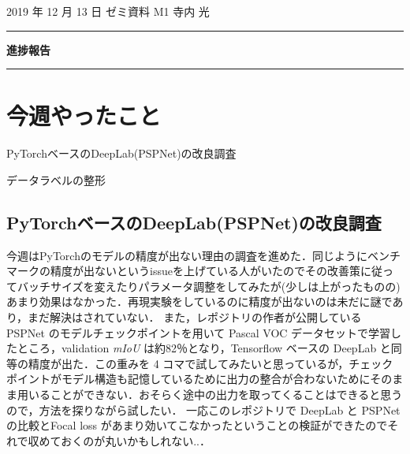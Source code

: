 \documentclass[onecolumn]{ujarticle}   %
\begin{document}
	\noindent

	\hspace{1em}
	2019 年 12 月 13 日
	ゼミ資料
	\hfill
	M1 寺内 光

	\vspace{2mm}

	\hrule

	\begin{center}
		{\Large \bf 進捗報告}
	\end{center}


	\hrule
	\vspace{3mm}

	\section{今週やったこと}
	\begin{itemize}{
		\item{PyTorchベースのDeepLab(PSPNet)の改良調査}
		\item{データラベルの整形}
	}
	\end{itemize}

	\subsection{PyTorchベースのDeepLab(PSPNet)の改良調査}
	今週はPyTorchのモデルの精度が出ない理由の調査を進めた．同じようにベンチマークの精度が出ないというissueを上げている人がいたのでその改善策に従ってバッチサイズを変えたりパラメータ調整をしてみたが(少しは上がったものの)あまり効果はなかった．再現実験をしているのに精度が出ないのは未だに謎であり，まだ解決はされていない．
	また，レポジトリの作者が公開している PSPNet のモデルチェックポイントを用いて Pascal VOC データセットで学習したところ，validation {\it mIoU} は約82％となり，Tensorflow ベースの DeepLab と同等の精度が出た．この重みを 4 コマで試してみたいと思っているが，チェックポイントがモデル構造も記憶しているために出力の整合が合わないためにそのまま用いることができない．おそらく途中の出力を取ってくることはできると思うので，方法を探りながら試したい．
	一応このレポジトリで DeepLab と PSPNet の比較とFocal loss があまり効いてこなかったということの検証ができたのでそれで収めておくのが丸いかもしれない..．
\end{document}
